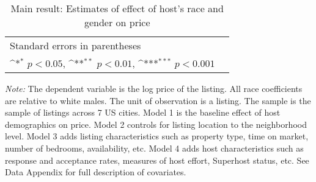\documentclass[11pt, oneside]{article}
\begin{document}



\newpage


\newpage


\newpage

\begin{table}[htbp]\centering
	\def\sym#1{\ifmmode^{#1}\else\(^{#1}\)\fi}
	\caption{Main result: Estimates of effect of host’s race and gender on price}
	\begin{tabular}{l*{5}{c}}
		\hline\hline

	\hline\hline
	\multicolumn{5}{l}{\footnotesize Standard errors in parentheses}\\
	\multicolumn{5}{l}{\footnotesize \sym{*} \(p<0.05\), \sym{**} \(p<0.01\), \sym{***} \(p<0.001\)}\\
	\end{tabular}

	\begin{tablenotes}
	
	\item {\it Note:} The dependent variable is the log price of the listing. All race coefficients are relative to white males. The unit of observation is a listing. The sample is the sample of listings across 7 US cities. Model 1 is the baseline effect of host demographics on price. Model 2 controls for listing location to the neighborhood level. Model 3 adds listing characteristics such as property type, time on market, number of bedrooms, availability, etc. Model 4 adds host characteristics such as response and acceptance rates, measures of host effort, Superhost status, etc. See Data Appendix for full description of covariates.  
\end{tablenotes}
\end{table}
\end{document}
